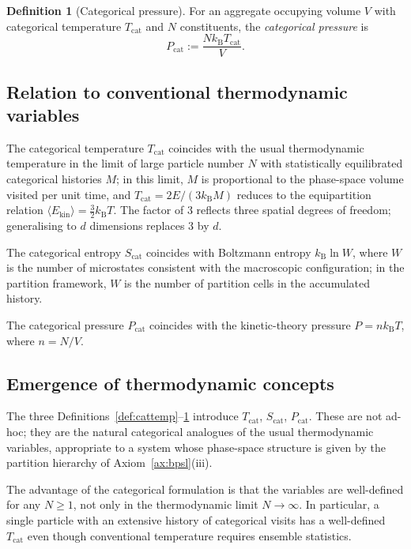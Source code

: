 \documentclass[11pt,twocolumn,a4paper]{article}
\theoremstyle{axiomstyle}
\theoremstyle{conseqstyle}
\theoremstyle{definition}
\newtheorem{definition}{Definition}
\theoremstyle{remark}
\newcommand{\kB}{k_{\mathrm{B}}}
\begin{document}
\begin{definition}[Categorical pressure]
\label{def:catpress}
For an aggregate occupying volume $V$ with categorical temperature $T_{\mathrm{cat}}$ and $N$ constituents, the \emph{categorical pressure} is
\begin{equation}
P_{\mathrm{cat}}:=\frac{N\kB T_{\mathrm{cat}}}{V}.
\label{eq:Pcat}
\end{equation}
\end{definition}

\subsection{Relation to conventional thermodynamic variables}

The categorical temperature $T_{\text{cat}}$ coincides with the usual thermodynamic temperature in the limit of large particle number $N$ with statistically equilibrated categorical histories $M$; in this limit, $M$ is proportional to the phase-space volume visited per unit time, and $T_{\text{cat}}=2E/(3\kB M)$ reduces to the equipartition relation $\langle E_{\text{kin}}\rangle=\tfrac{3}{2}\kB T$. The factor of $3$ reflects three spatial degrees of freedom; generalising to $d$ dimensions replaces $3$ by $d$.

The categorical entropy $S_{\text{cat}}$ coincides with Boltzmann entropy $\kB\ln W$, where $W$ is the number of microstates consistent with the macroscopic configuration; in the partition framework, $W$ is the number of partition cells in the accumulated history.

The categorical pressure $P_{\text{cat}}$ coincides with the kinetic-theory pressure $P=n\kB T$, where $n=N/V$.

\subsection{Emergence of thermodynamic concepts}

The three Definitions~\ref{def:cattemp}--\ref{def:catpress} introduce $T_{\text{cat}}$, $S_{\text{cat}}$, $P_{\text{cat}}$. These are not ad-hoc; they are the natural categorical analogues of the usual thermodynamic variables, appropriate to a system whose phase-space structure is given by the partition hierarchy of Axiom~\ref{ax:bpsl}(iii).

The advantage of the categorical formulation is that the variables are well-defined for any $N\ge 1$, not only in the thermodynamic limit $N\to\infty$. In particular, a single particle with an extensive history of categorical visits has a well-defined $T_{\text{cat}}$ even though conventional temperature requires ensemble statistics.
\end{document}
